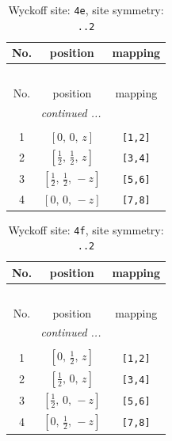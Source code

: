 \documentclass[fleqn,8pt]{jsarticle}
\begin{document}
\begin{longtable}{ccc}
\caption{Wyckoff site: {\tt 4e}, site symmetry: {\tt ..2}}
 \\
 \hline \hline
No. & position & mapping \\ \hline \endfirsthead

\multicolumn{2}{l}{\tablename\ \thetable{}} \\
 \hline \hline
No. & position & mapping \\ \hline \endhead

 \hline \hline
\multicolumn{2}{r}{\footnotesize\it continued ...} \\ \endfoot

 \hline \hline
\multicolumn{2}{r}{} \\ \endlastfoot

1 & $\left[ 0,\, 0,\, z \right]$ & {\tt [1,2]} \\ \hline
2 & $\left[ \frac{1}{2},\, \frac{1}{2},\, z \right]$ & {\tt [3,4]} \\ \hline
3 & $\left[ \frac{1}{2},\, \frac{1}{2},\, - z \right]$ & {\tt [5,6]} \\ \hline
4 & $\left[ 0,\, 0,\, - z \right]$ & {\tt [7,8]} \\
\end{longtable}
\renewcommand{\arraystretch}{1.2}
\begin{longtable}{ccc}
\caption{Wyckoff site: {\tt 4f}, site symmetry: {\tt ..2}}
 \\
 \hline \hline
No. & position & mapping \\ \hline \endfirsthead

\multicolumn{2}{l}{\tablename\ \thetable{}} \\
 \hline \hline
No. & position & mapping \\ \hline \endhead

 \hline \hline
\multicolumn{2}{r}{\footnotesize\it continued ...} \\ \endfoot

 \hline \hline
\multicolumn{2}{r}{} \\ \endlastfoot

1 & $\left[ 0,\, \frac{1}{2},\, z \right]$ & {\tt [1,2]} \\ \hline
2 & $\left[ \frac{1}{2},\, 0,\, z \right]$ & {\tt [3,4]} \\ \hline
3 & $\left[ \frac{1}{2},\, 0,\, - z \right]$ & {\tt [5,6]} \\ \hline
4 & $\left[ 0,\, \frac{1}{2},\, - z \right]$ & {\tt [7,8]} \\
\end{longtable}
\end{document}
